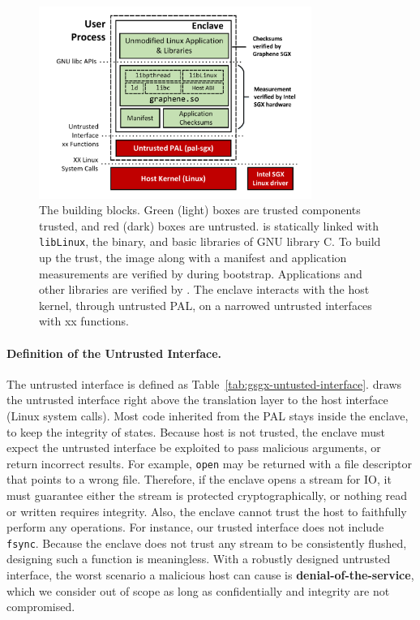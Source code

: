 \begin{figure}[t!]
\centering
\includegraphics[width=3.5in]{graphene-sgx/figures/architecture.pdf}
\vspace{-0.1in}
\footnotesize
\caption[\sysname{}: building blocks.]
{The \sysname{} building blocks.
Green (light) boxes are trusted components trusted,
and red (dark) boxes are untrusted.
\sysname{} is statically linked with {\tt libLinux},
the \libos{} binary, and basic libraries of GNU library C.
To build up the trust, the \sysname{} image along with
a manifest and application measurements
are verified by \sgx{} during bootstrap. Applications and other libraries
are verified by \sysname{}. The enclave interacts with the host kernel,
through untrusted PAL, on a narrowed untrusted interfaces with xx functions.}
\label{fig:gsgx:arch}
\end{figure}

\paragraph{Definition of the Untrusted Interface.}
The untrusted interface is defined as Table~\ref{tab:gsgx-untusted-interface}.
\sysname{} draws the untrusted interface right above the translation layer
to the host interface (Linux system calls).
Most code inherited from the \graphene{} PAL stays inside
the enclave, to keep the integrity of states.
Because host is not trusted,
the enclave must expect the untrusted interface be exploited to
pass malicious arguments, or return incorrect results.
For example, {\tt open} may be returned with a file descriptor that points
to a wrong file. Therefore, if the enclave opens a stream for IO,
it must guarantee either the stream is protected cryptographically,
or nothing read or written requires integrity.
Also, the enclave cannot trust the host to faithfully perform any operations.
For instance, our trusted interface does not include {\tt fsync}.
Because the enclave does not trust any stream to be consistently flushed,
designing such a function is meaningless.
With a robustly designed untrusted interface,
the worst scenario a malicious host can cause is {\bf denial-of-the-service},
which we consider out of scope
as long as confidentially and integrity are not compromised.

